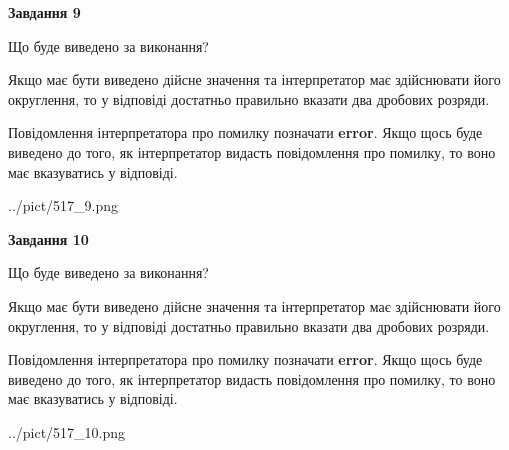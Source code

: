 \documentclass[12pt, ukrainian]{article}
\begin{document}
{\begin {Large}
{\begin {center}\textbf{Завдання 9}\end {center}}\par
Що буде виведено за виконання? \par

Якщо має бути виведено дійсне значення та інтерпретатор має здійснювати його округлення, 
то у відповіді достатньо правильно вказати два дробових розряди.

Повідомлення інтерпретатора про помилку позначати \textbf{error}.
Якщо щось буде виведено до того, як інтерпретатор видасть повідомлення про помилку, 
то воно має вказуватись у відповіді. \par

\begin{center}
	{../pict/517_9.png}
\end{center}
\newpage

{\begin {center}\textbf{Завдання 10}\end {center}}\par
Що буде виведено за виконання? \par

Якщо має бути виведено дійсне значення та інтерпретатор має здійснювати його округлення, 
то у відповіді достатньо правильно вказати два дробових розряди.

Повідомлення інтерпретатора про помилку позначати \textbf{error}.
Якщо щось буде виведено до того, як інтерпретатор видасть повідомлення про помилку, 
то воно має вказуватись у відповіді. \par

\begin{center}
	{../pict/517_10.png}
\end{center}
\newpage

\end {Large}}
\end{document}
